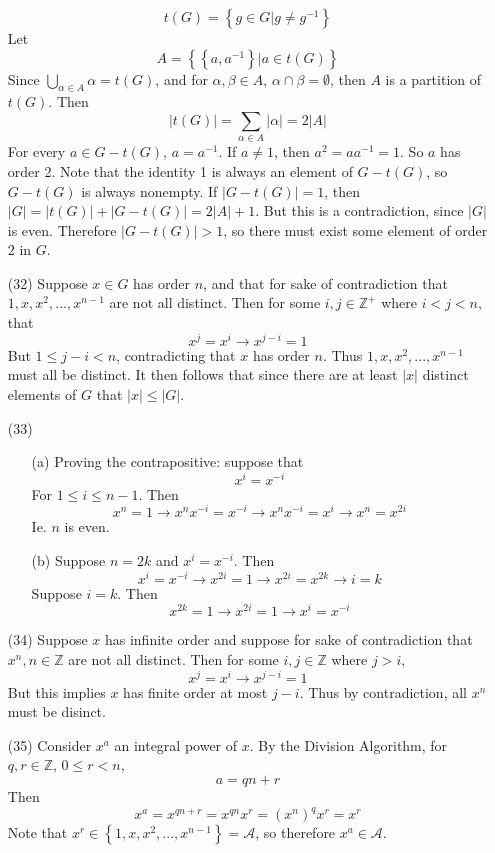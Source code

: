 \documentclass[12pt]{article}
\begin{document}
\begin{itemize}
$$t(G) = \left\lbrace g \in G | g \neq g^{-1} \right\rbrace$$
Let
$$A = \left\lbrace \left\lbrace a, a^{-1} \right\rbrace | a \in t(G) \right\rbrace$$
Since $\bigcup_{\alpha \in A}\alpha = t(G)$, and for $\alpha, \beta \in A$, $\alpha \cap \beta = \emptyset$, then $A$ is a partition of $t(G)$. Then
$$|t(G)| = \sum_{\alpha \in A}|\alpha| = 2|A|$$
For every $a \in G - t(G)$, $a = a^{-1}$. If $a \neq 1$, then $a^2 = aa^{-1} = 1$. So $a$ has order 2. Note that the identity 1 is always an element of $G - t(G)$, so $G - t(G)$ is always nonempty. If $|G - t(G)| = 1$, then $|G| = |t(G)| + |G - t(G)| = 2|A| + 1$. But this is a contradiction, since $|G|$ is even. Therefore $|G - t(G)| > 1$, so there must exist some element of order $2$ in $G$.
\item[(32)]
Suppose $x \in G$ has order $n$, and that for sake of contradiction that $1, x, x^2, ..., x^{n-1}$ are not all distinct. Then for some $i,j \in \mathbb{Z}^+$ where $i < j < n$, that
$$x^j = x^i \rightarrow x^{j - i} = 1$$
But $1 \leq j - i < n$, contradicting that $x$ has order $n$. Thus $1, x, x^2, ..., x^{n-1}$ must all be distinct. It then follows that since there are at least $|x|$ distinct elements of $G$ that $|x| \leq |G|$.
\item[(33)]
\begin{itemize}
\item[(a)]
Proving the contrapositive: suppose that
$$x^i = x^{-i}$$
For $1 \leq i \leq n - 1$. Then
$$x^n = 1 \rightarrow x^nx^{-i} = x^{-i} \rightarrow x^nx^{-i} = x^i \rightarrow x^n = x^{2i}$$
Ie. $n$ is even. 
\item[(b)]
Suppose $n = 2k$ and $x^i = x^{-i}$. Then
$$x^i = x^{-i} \rightarrow x^{2i} = 1 \rightarrow x^{2i} = x^{2k} \rightarrow i = k$$
Suppose $i = k$. Then
$$x^{2k} = 1\rightarrow x^{2i} = 1 \rightarrow x^i = x^{-i}$$
\end{itemize}
\item[(34)]
Suppose $x$ has infinite order and suppose for sake of contradiction that $x^n, n \in \mathbb{Z}$ are not all distinct. Then for some $i, j \in \mathbb{Z}$ where $j > i$, 
$$x^j = x^i \rightarrow x^{j - i} = 1$$
But this implies $x$ has finite order at most $j - i$. Thus by contradiction, all $x^n$ must be disinct.
\item[(35)]
Consider $x^a$ an integral power of $x$. By the Division Algorithm, for $q, r \in \mathbb{Z}$, $0 \leq r < n$,
$$a = qn + r$$
Then
$$x^a = x^{qn + r} = x^{qn}x^r = (x^n)^qx^r = x^r$$
Note that $x^r \in \left\lbrace 1, x, x^2, ..., x^{n - 1} \right\rbrace = \mathcal{A}$, so therefore $x^a \in \mathcal{A}$.

\end{itemize}
\end{document}
